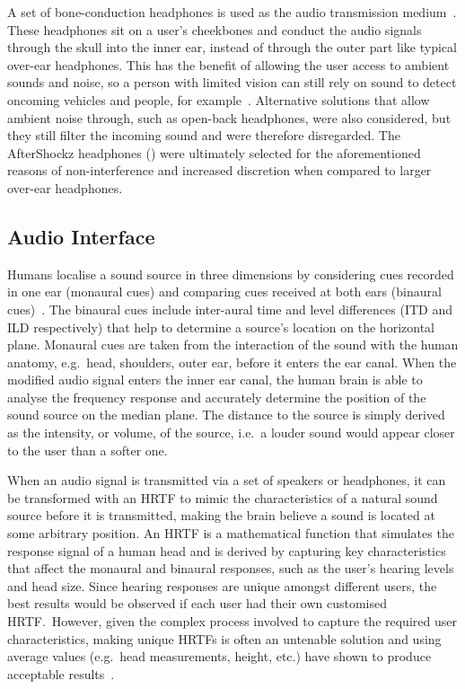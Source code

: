 \documentclass[acmsmall]{acmart}
\begin{document}
A set of bone-conduction headphones is used as the audio transmission medium~\citep{lock2019bone}.
These headphones sit on a user's cheekbones and conduct the audio signals through the skull into the inner ear, instead of through the outer part like typical over-ear headphones. 
This has the benefit of allowing the user access to ambient sounds and noise, so a person with limited vision can still rely on sound to detect oncoming vehicles and people, for example~\citep{lichtenstein2012headphone}.
Alternative solutions that allow ambient noise through, such as open-back headphones, were also considered, but they still filter the incoming sound and were therefore disregarded.
The AfterShockz headphones () were ultimately selected for the aforementioned reasons of non-interference and increased discretion when compared to larger over-ear headphones. 

\subsection{Audio Interface}

Humans localise a sound source in three dimensions by considering cues recorded in one ear (monaural cues) and comparing cues received at both ears (binaural cues)~\citep{blauert1997spatial,blauert1969sound,lock2019bone}.
The binaural cues include inter-aural time and level differences (ITD and ILD respectively) that help to determine a source's location on the horizontal plane.
Monaural cues are taken from the interaction of the sound with the human anatomy, e.g.\ head, shoulders, outer ear, before it enters the ear canal.
When the modified audio signal enters the inner ear canal, the human brain is able to analyse the frequency response and accurately determine the position of the sound source on the median plane. 
The distance to the source is simply derived as the intensity, or volume, of the source, i.e.\ a louder sound would appear closer to the user than a softer one. 

When an audio signal is transmitted via a set of speakers or headphones, it can be transformed with an HRTF to mimic the characteristics of a natural sound source before it is transmitted, making the brain believe a sound is located at some arbitrary position.
An HRTF is a mathematical function that simulates the response signal of a human head and is derived by capturing key characteristics that affect the monaural and binaural responses, such as the user's hearing levels and head size.
Since hearing responses are unique amongst different users, the best results would be observed if each user had their own customised HRTF.\
However, given the complex process involved to capture the required user characteristics, making unique HRTFs is often an untenable solution and using average values (e.g.\ head measurements, height, etc.) have shown to produce acceptable results~\citep{gardner1995hrtf}.
\end{document}
